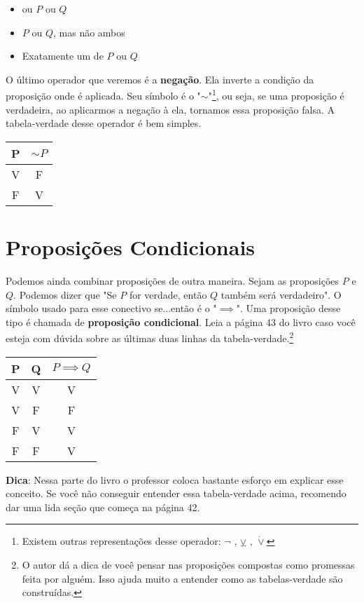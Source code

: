 \documentclass[a4paper,11pt]{book}
\theoremstyle{definition}
\begin{document}
\begin{itemize}
\item ou $P$ ou $Q$
\item $P$ ou $Q$, mas não ambos
\item Exatamente um de $P$ ou $Q$
\end{itemize}

O último operador que veremos é a \textbf{negação}. Ela inverte a condição da proposição onde é aplicada. Seu símbolo é o "$\sim$"\footnote{Existem outras representações desse operador: $\lnot$ , $\veebar$ , $\dot\lor$}, ou seja, se uma proposição é verdadeira, ao aplicarmos a negação à ela, tornamos essa proposição falsa. A tabela-verdade desse operador é bem simples.

\begin{center}
\begin{tabular}{ c || c }
 P & $\sim P$ \\ 
 \hline
 V & F \\  
 F & V
\end{tabular}
\end{center}

\section{Proposições Condicionais}

Podemos ainda combinar proposições de outra maneira. Sejam as proposições $P$ e $Q$. Podemos dizer que "Se $P$ for verdade, então $Q$ também será verdadeiro". O símbolo usado para esse conectivo se...então é o "$\implies$". Uma proposição desse tipo é chamada de \textbf{proposição condicional}. Leia a página 43 do livro caso você esteja com dúvida sobre as últimas duas linhas da tabela-verdade.\footnote{O autor dá a dica de você pensar nas proposições compostas como promessas feita por alguém. Isso ajuda muito a entender como as tabelas-verdade são construídas.}

\begin{center}
\begin{tabular}{ c c || c }
 P & Q & $P \implies Q$ \\ 
 \hline
 V & V & V \\  
 V & F & F \\  
 F & V & V \\  
 F & F & V
\end{tabular}
\end{center}

\textbf{Dica}: Nessa parte do livro o professor coloca bastante esforço em explicar esse conceito. Se você não conseguir entender essa tabela-verdade acima, recomendo dar uma lida seção que começa na página 42.
\end{document}
